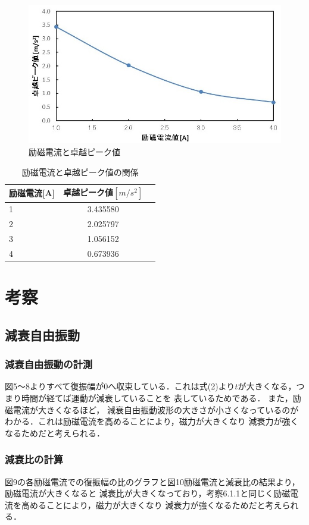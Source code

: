 \documentclass[a4paper,10.5pt]{jsarticle}
\begin{document}
\begin{figure}[h]
  \centering
  \includegraphics[width=14cm]{11.png}
  \caption{励磁電流と卓越ピーク値}
\end{figure}
\newpage
\begin{table}[h]
  \centering
  \caption{励磁電流と卓越ピーク値の関係}
  \begin{tabular}{l|c|r}
    励磁電流[A]&卓越ピーク値$[m/s^2]$\\\hline\hline
      1&3.435580 \\ \hline
      2&2.025797  \\
      3&1.056152  \\
      4&0.673936  \\\hline
  \end{tabular}
\end{table}

\section{考察}
\subsection{減衰自由振動}
\subsubsection{減衰自由振動の計測}
図5〜8よりすべて復振幅が0へ収束している．これは式(2)より$t$が大きくなる，つまり時間が経てば運動が減衰していることを
表しているためである．
また，励磁電流が大きくなるほど，
減衰自由振動波形の大きさが小さくなっているのがわかる．これは励磁電流を高めることにより，磁力が大きくなり
減衰力が強くなるためだと考えられる．
\subsubsection{減衰比の計算}
図9の各励磁電流での復振幅の比のグラフと図10励磁電流と減衰比の結果より，励磁電流が大きくなると
減衰比が大きくなっており，考察6.1.1と同じく励磁電流を高めることにより，磁力が大きくなり
減衰力が強くなるためだと考えられる．
\end{document}
